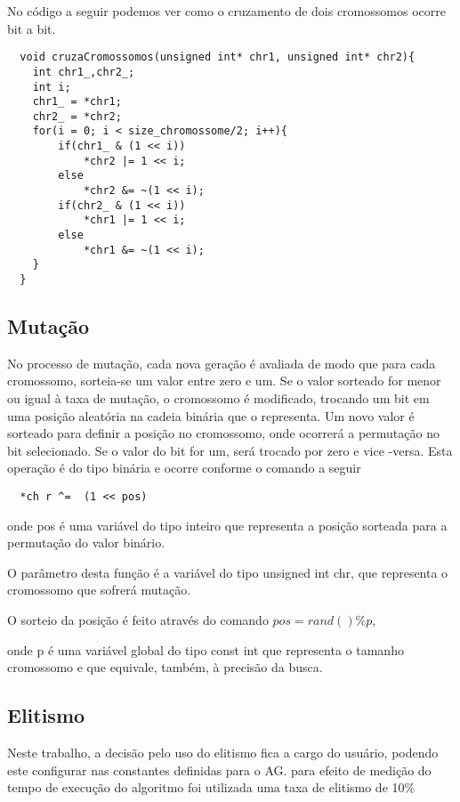 \documentclass[
    12pt,               %
    twoside,            %
    a4paper,            %
    english,            %
    french,             %
    spanish,            %
    brazil,             %
    ]{abntex2}
\begin{document}
  No código a seguir podemos ver como o cruzamento de dois cromossomos ocorre bit a bit.

  \begin{verbatim}
  void cruzaCromossomos(unsigned int* chr1, unsigned int* chr2){
    int chr1_,chr2_;
    int i;
    chr1_ = *chr1;
    chr2_ = *chr2;
    for(i = 0; i < size_chromossome/2; i++){
        if(chr1_ & (1 << i))
            *chr2 |= 1 << i;
        else
            *chr2 &= ~(1 << i);
        if(chr2_ & (1 << i))
            *chr1 |= 1 << i;
        else
            *chr1 &= ~(1 << i);
    }
  }

  \end{verbatim}

\subsection{Mutação}

  No processo de mutação, cada nova geração é avaliada de modo que para cada cromossomo, sorteia-se um valor entre zero e um. Se o valor sorteado for menor ou igual à taxa de mutação, o cromossomo é modificado, trocando um bit em uma posição aleatória na cadeia binária que o representa.
  Um novo valor é sorteado para definir a posição no cromossomo, onde ocorrerá a permutação no bit selecionado. Se o valor do bit for um, será trocado por zero e vice -versa. Esta operação é do tipo binária e ocorre conforme o comando a seguir
  
  \begin{verbatim}
  *ch r ^=  (1 << pos)
  \end{verbatim}

  onde pos é uma variável do tipo inteiro que representa a posição sorteada para a permutação do valor binário.

  O parâmetro desta função é a variável do tipo unsigned int chr, que representa o cromossomo que sofrerá mutação. 

  O sorteio da posição é feito através do comando $pos = rand() \% p$,

  onde p é uma variável global do tipo const int que representa o tamanho cromossomo e que equivale, também, à precisão da busca.

\subsection{Elitismo}
  
  Neste trabalho, a decisão pelo uso do elitismo fica a cargo do usuário, podendo este configurar nas constantes definidas para o AG. para efeito de medição do tempo de execução do algoritmo foi utilizada uma taxa de elitismo de 10\%
\end{document}
